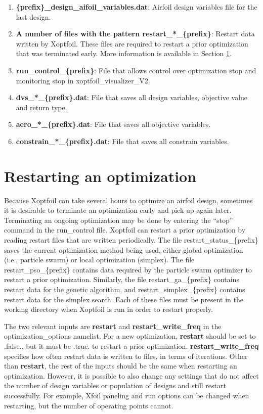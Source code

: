 \documentclass[11pt]{article}
\begin{document}
\begin{enumerate}
\item{\textbf{\{prefix\}\_design\_aifoil\_variables.dat}: Airfoil design variables file for the
	last design.}


\item{\textbf{A number of files with the pattern restart\_*\_\{prefix\}}: Restart data
written by Xoptfoil.  These files are required to restart a prior optimization that was
terminated early. More information is available in Section \ref{sec:restarting}.}

\item{\textbf{run\_control\_\{prefix\}}: File that allows control over optimization stop and monitoring stop in 
	xoptfoil\_visualizer\_V2.}

\item{\textbf{dvs\_*\_\{prefix\}.dat}: File that saves all design variables, objective value and return type.}
\item{\textbf{aero\_*\_\{prefix\}.dat}: File that saves all objective variables.}
\item{\textbf{constrain\_*\_\{prefix\}.dat}: File that saves all constrain variables.}
\end{enumerate}

\section{Restarting an optimization}\label{sec:restarting}

Because Xoptfoil can take several hours to optimize an airfoil design, sometimes it is
desirable to terminate an optimization early and pick up again later. Terminating an
ongoing optimization may be done by entering the ``stop'' command in the run\_control
file. Xoptfoil can restart a prior optimization
by reading restart files that are written periodically. The file
restart\_status\_\{prefix\}
saves the current optimization method being used, either global optimization (i.e.,
particle swarm) or local optimization (simplex).  The file restart\_pso\_\{prefix\} contains
data required by the particle swarm optimizer to restart a prior optimization. Similarly,
the file restart\_ga\_\{prefix\} contains restart data for the genetic algorithm,
and restart\_simplex\_\{prefix\} contains restart data for the simplex search.
Each of these files must be
present in the working directory when Xoptfoil is run in order to restart properly.

The two relevant inputs are \textbf{restart} and \textbf{restart\_write\_freq} in the
optimization\_options namelist.  For a new optimization, \textbf{restart} should be set to
.false., but it must be .true. to restart a prior optimization.
\textbf{restart\_write\_freq} specifies how often restart data is written to files, in
terms of iterations.  Other than \textbf{restart}, the rest of the inputs should be the
same when restarting an optimization.  However, it is possible to also change any settings
that do not affect the number of design variables or population of designs and still
restart successfully.  For example, Xfoil paneling and run options can be changed when
restarting, but the number of operating points cannot. 
\end{document}
